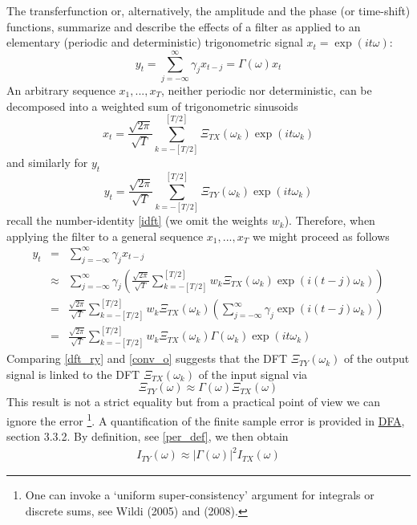 \documentclass[a4paper]{book}
\begin{document}
The transferfunction or, alternatively, the amplitude and the phase (or time-shift) functions,
summarize and describe the effects of a filter as
applied to an elementary (periodic and deterministic) trigonometric signal $x_t=\exp(it\omega)$:
\[
y_t=\sum_{j=-\infty}^{\infty}\gamma_jx_{t-j}={\Gamma}(\omega)x_t
\]
An arbitrary sequence $x_1,...,x_T$, neither periodic nor deterministic, can be decomposed into a weighted sum of trigonometric  sinusoids
\begin{equation}\label{dft_r}
x_t=\frac{\sqrt{2\pi}}{\sqrt{ T}}\sum_{k=-[T/2]}^{[T/2]} \Xi_{TX}(\omega_k)\exp(it\omega_k )
\end{equation}
and similarly for $y_t$
\begin{equation}\label{dft_ry}
y_t=\frac{\sqrt{2\pi}}{\sqrt{ T}}\sum_{k=-[T/2]}^{[T/2]} \Xi_{TY}(\omega_k)\exp(it\omega_k )
\end{equation}
recall the number-identity \ref{idft} (we omit the weights $w_k$). Therefore, when applying the filter to
a general sequence $x_1,...,x_T$ we might proceed as follows
\begin{eqnarray}
y_t&=&\sum_{j=-\infty}^{\infty}\gamma_jx_{t-j}\nonumber\\
&\approx&\sum_{j=-\infty}^{\infty}\gamma_j\left(\frac{\sqrt{2\pi}}{\sqrt{ T}}\sum_{k=-[T/2]}^{[T/2]} w_k\Xi_{TX}(\omega_k)\exp(i(t-j)\omega_k )\right)\label{conv_app}\\
&=&\frac{\sqrt{2\pi}}{\sqrt{ T}}\sum_{k=-[T/2]}^{[T/2]} w_k\Xi_{TX}(\omega_k)\left(\sum_{j=-\infty}^{\infty}\gamma_j\exp(i(t-j)\omega_k )\right)\nonumber\\
&=&\frac{\sqrt{2\pi}}{\sqrt{ T}}\sum_{k=-[T/2]}^{[T/2]} w_k\Xi_{TX}(\omega_k)\Gamma(\omega_k)\exp(it\omega_k )\label{conv_o}
\end{eqnarray}
Comparing \ref{dft_ry} and \ref{conv_o} suggests that the DFT $\Xi_{TY}(\omega_k)$ of the output signal is linked to the DFT $\Xi_{TX}(\omega_k)$
of the input signal via
\begin{equation}\label{convolution_dft}
\Xi_{TY}(\omega)\approx\Gamma(\omega)\Xi_{TX}(\omega)
\end{equation}
This result is not a strict equality but from a practical point of view we can
ignore the error \footnote{One can invoke a `uniform super-consistency' argument for integrals or discrete sums, see  Wildi (2005) and (2008).}. A quantification of the finite sample error is provided in \href{http://blog.zhaw.ch/sef/files/2014/10/DFA.pdf}{DFA}, section 3.3.2. By definition, see \ref{per_def}, we then obtain
\begin{eqnarray}\label{conv_per}
I_{TY}(\omega)\approx\left|\Gamma(\omega)\right|^2I_{TX}(\omega)
\end{eqnarray}
\end{document}
